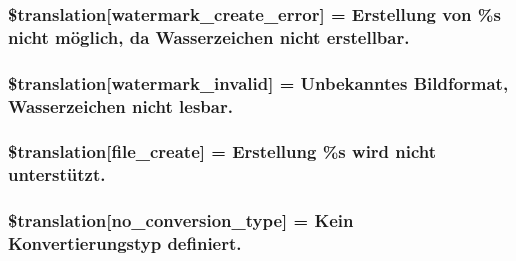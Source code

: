 \subsubsection[{\$translation}]{\setlength{\rightskip}{0pt plus 5cm}\$translation\mbox{[}\textquotesingle{}watermark\+\_\+create\+\_\+error\textquotesingle{}\mbox{]} = \textquotesingle{}Erstellung von \%s nicht möglich, da Wasserzeichen nicht erstellbar.\textquotesingle{}}\label{class_8upload_8de___d_e_8php_aabca0b65dadbc6184415c16375f284ca}
\hypertarget{class_8upload_8de___d_e_8php_ac336e7a5701e47ba4a05e9e498a3cc44}{}
\subsubsection[{\$translation}]{\setlength{\rightskip}{0pt plus 5cm}\$translation\mbox{[}\textquotesingle{}watermark\+\_\+invalid\textquotesingle{}\mbox{]} = \textquotesingle{}Unbekanntes Bildformat, Wasserzeichen nicht lesbar.\textquotesingle{}}\label{class_8upload_8de___d_e_8php_ac336e7a5701e47ba4a05e9e498a3cc44}
\hypertarget{class_8upload_8de___d_e_8php_a1ecb4673e4fb69e06b3f20b65cecf30a}{}
\subsubsection[{\$translation}]{\setlength{\rightskip}{0pt plus 5cm}\$translation\mbox{[}\textquotesingle{}file\+\_\+create\textquotesingle{}\mbox{]} = \textquotesingle{}Erstellung \%s wird nicht unterstützt.\textquotesingle{}}\label{class_8upload_8de___d_e_8php_a1ecb4673e4fb69e06b3f20b65cecf30a}
\hypertarget{class_8upload_8de___d_e_8php_a4712d7ec28e9a7f17eb3338af2358363}{}
\subsubsection[{\$translation}]{\setlength{\rightskip}{0pt plus 5cm}\$translation\mbox{[}\textquotesingle{}no\+\_\+conversion\+\_\+type\textquotesingle{}\mbox{]} = \textquotesingle{}Kein Konvertierungstyp definiert.\textquotesingle{}}\label{class_8upload_8de___d_e_8php_a4712d7ec28e9a7f17eb3338af2358363}
\hypertarget{class_8upload_8de___d_e_8php_a783c9358bcf54a054545b50098bc679b}{}
